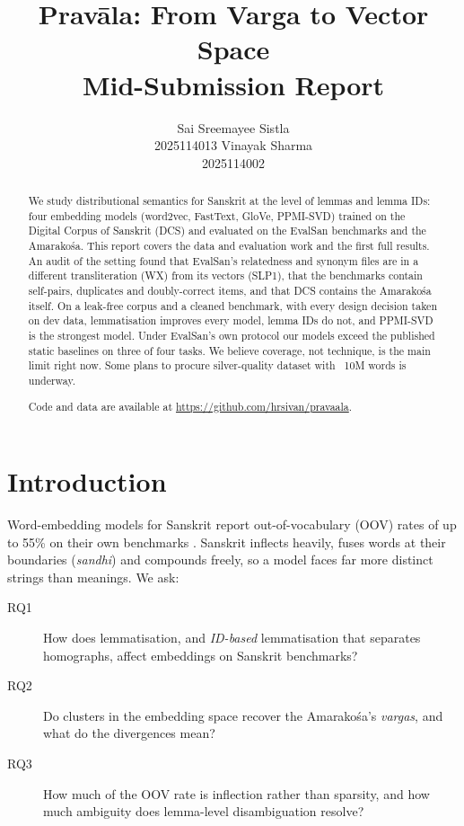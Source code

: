 \documentclass[11pt]{article}
\title{Pravāla: From Varga to Vector Space\\[2pt]
\large Mid-Submission Report}
\author{Sai Sreemayee Sistla \\ 2025114013
\And
Vinayak Sharma \\ 2025114002}
\begin{document}
\maketitle

\begin{abstract}
We study distributional semantics for Sanskrit at the level of lemmas and
lemma IDs: four embedding models (word2vec, FastText, GloVe, PPMI-SVD)
trained on the Digital Corpus of Sanskrit (DCS) and evaluated on the EvalSan
benchmarks and the Amarakośa. This report covers the data and evaluation
work and the first full results. An audit of the setting found that
EvalSan's relatedness and synonym files are in a different transliteration
(WX) from its vectors (SLP1), that the benchmarks contain self-pairs,
duplicates and doubly-correct items, and that DCS contains the Amarakośa
itself. On a leak-free corpus and a cleaned benchmark, with every design
decision taken on dev data, lemmatisation improves every model, lemma IDs do
not, and PPMI-SVD is the strongest model. Under EvalSan's own protocol our
models exceed the published static baselines on three of four tasks.
We believe coverage, not technique, is the main limit right now.
Some plans to procure silver-quality dataset with ~10M words is underway.

Code and data are available at \url{https://github.com/hrsivan/pravaala}.
\end{abstract}

\section{Introduction}
Word-embedding models for Sanskrit report out-of-vocabulary (OOV) rates of up
to 55\% on their own benchmarks \citep{sandhan2023evalsan}. Sanskrit inflects
heavily, fuses words at their boundaries (\emph{sandhi}) and compounds
freely, so a model faces far more distinct strings than meanings. We ask:
\begin{description}
\item[RQ1] How does lemmatisation, and \emph{ID-based} lemmatisation that
  separates homographs, affect embeddings on Sanskrit benchmarks?
\item[RQ2] Do clusters in the embedding space recover the Amarakośa's
  \emph{vargas}, and what do the divergences mean?
\item[RQ3] How much of the OOV rate is inflection rather than sparsity, and
  how much ambiguity does lemma-level disambiguation resolve?
\end{description}
\end{document}
